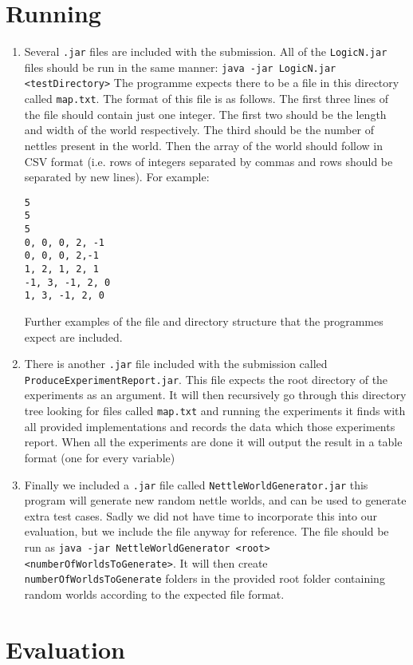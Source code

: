 \documentclass[british]{article}
\newcommand{\code}[1]{\texttt{#1}}
\begin{document}
\section{Running}
\label{running}
\begin{enumerate}
\item  Several \code{.jar} files are included with the submission. All of the \code{LogicN.jar} files should be run in the same manner: \code{java -jar LogicN.jar <testDirectory>} The programme expects there to be a file in this directory called \code{map.txt}. The format of this file is as follows. The first three lines of the file should contain just one integer. The first two should be the length and width of the world respectively. The third should be the number of nettles present in the world. Then the array of the world should follow in CSV format (i.e. rows of integers separated by commas and rows should be separated by new lines). For example: \begin{lstlisting}
5
5
5
0, 0, 0, 2, -1
0, 0, 0, 2,-1
1, 2, 1, 2, 1
-1, 3, -1, 2, 0
1, 3, -1, 2, 0
\end{lstlisting} Further examples of the file and directory structure that the programmes expect are included.
\item There is another \code{.jar} file included with the submission called \code{ProduceExperimentReport.jar}. This file expects the root directory of the experiments as an argument. It will then recursively go through this directory tree looking for files called \code{map.txt}  and running the experiments it finds with all provided implementations and records the data which those experiments report. When all the experiments are done it will output the result in a table format (one for every variable)  
\item Finally we included a \code{.jar} file called \code{NettleWorldGenerator.jar} this program will generate new random nettle worlds, and can be used to generate extra test cases. Sadly we did not have time to incorporate this into our evaluation, but we include the file anyway for reference. The file should be run as \code{java -jar NettleWorldGenerator <root> <numberOfWorldsToGenerate>}. It will then create \code{numberOfWorldsToGenerate} folders in the provided root folder containing random worlds according to the expected file format.
\end{enumerate}
\section{Evaluation}
\label{evals}
\end{document}
